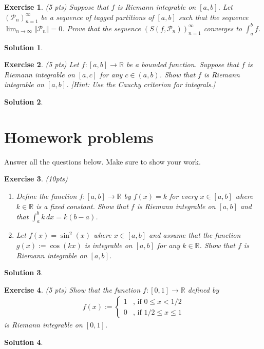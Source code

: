 \documentclass[12pt]{article}
\newcommand{\bR}{\mathbb{R}}
\newcommand{\cP}{\mathcal{P}}
\newcommand{\ra}{\rightarrow}
\theoremstyle{plain}
\newtheorem{exer}{\textbf{Exercise}}}
\theoremstyle{plain}
\newtheorem*{sol}{\textbf{Solution}}}
\begin{document}
\begin{exer}
(5 pts)
Suppose that $f$ is Riemann integrable on $[a, b]$. Let $( \cP_n )_{n =1}^\infty$ be a sequence of tagged partitions of $[a, b]$ such that the sequence $\lim_{n \ra \infty} \Vert \cP_n \Vert = 0$. Prove that the sequence $( S (f , \cP_n ))_{n = 1}^\infty$ converges to $\int_a^b f$.
\end{exer}
\begin{sol}

\end{sol}


\begin{exer}
(5 pts)
Let $f : [a, b] \ra \bR$ be a bounded function. Suppose that $f$ is Riemann integrable on $[a, c]$ for any $c \in (a, b)$. Show that $f$ is Riemann integrable on $[a, b]$. [Hint: Use the Cauchy criterion for integrals.]
\end{exer}
\begin{sol}

\end{sol}

\section{Homework problems}
Answer all the questions below. Make sure to show your work.


\begin{exer}
(10pts)
\begin{enumerate}[label=\textbf{\alph*)}]
\item Define the function $f : [a, b] \ra \bR$ by $f(x) = k$ for every $x \in [a, b]$ where $k \in \bR$ is a fixed constant. Show that $f$ is Riemann integrable on $[a, b]$ and that $\int_a^b k \, dx = k ( b-a)$.
\item Let $f(x) = \sin^2 (x)$ where $x \in [a, b]$ and assume that the function $g(x) := \cos (kx )$ is integrable on $[a, b]$ for any $k \in \bR$. Show that $f$ is Riemann integrable on $[a, b]$.
\end{enumerate}
\end{exer}
\begin{sol}

\end{sol}

\begin{exer}
(5 pts)
Show that the function $f : [0, 1] \ra \bR$ defined by
	\begin{align*}
	f(x) := \begin{cases}
	1 & \text{, if } 0 \leq x < 1/2 \\
	0 & \text{, if } 1/2 \leq x \leq 1 
	\end{cases}
	\end{align*}
is Riemann integrable on $[0, 1]$.
\end{exer}
\begin{sol}

\end{sol}
\end{document}
